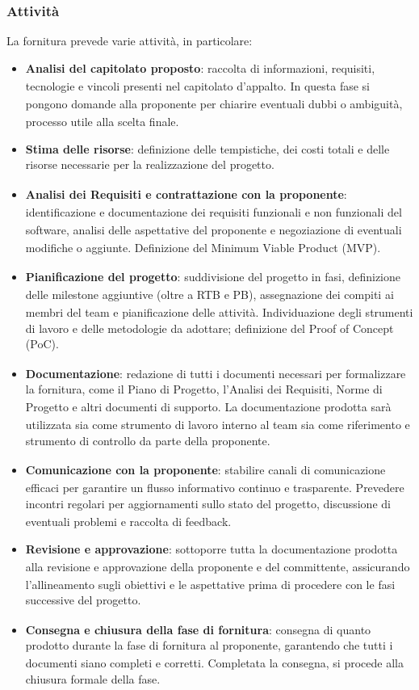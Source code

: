 \documentclass[a4paper,11pt]{article}
\newcommand{\G}{\textsubscript{\scalebox{0.6}{\textbf{G}}}}
\begin{document}
\subsubsection{Attività}
La fornitura prevede varie attività, in particolare: 
\begin{itemize}
    \item \textbf{Analisi del capitolato\G{} proposto}: raccolta di informazioni, requisiti\G{}, tecnologie e vincoli presenti nel 
    capitolato\G{} d'appalto. In questa fase si pongono domande alla proponente\G{} per chiarire eventuali dubbi o ambiguità, processo utile alla scelta finale.
    \item \textbf{Stima delle risorse}: definizione delle tempistiche, dei costi totali e delle risorse necessarie per la 
    realizzazione del progetto\G{}.
    \item \textbf{Analisi dei Requisiti\G{} e contrattazione con la proponente\G{}}: identificazione e documentazione dei requisiti\G{} 
    funzionali e non funzionali del software, analisi delle aspettative del proponente\G{} e negoziazione di eventuali modifiche o aggiunte. Definizione del Minimum Viable Product (MVP)\G{}.
    \item \textbf{Pianificazione del progetto\G{}}: suddivisione del progetto\G{} in fasi, definizione delle milestone\G{} aggiuntive (oltre a RTB\G{} e PB\G{}), 
    assegnazione dei compiti ai membri del team e pianificazione delle attività. Individuazione degli strumenti di lavoro e delle 
    metodologie da adottare; definizione del Proof of Concept (PoC)\G{}.
    \item \textbf{Documentazione}: redazione di tutti i documenti necessari per formalizzare la fornitura, come il Piano di Progetto\G{}, 
    l'Analisi dei Requisiti\G{}, Norme di Progetto\G{} e altri documenti di supporto. La documentazione prodotta sarà utilizzata sia come 
    strumento di lavoro interno al team sia come riferimento e strumento di controllo da parte della proponente\G{}.
    \item \textbf{Comunicazione con la proponente\G{}}: stabilire canali di comunicazione efficaci per garantire un flusso informativo 
    continuo e trasparente. Prevedere incontri regolari per aggiornamenti sullo stato del progetto\G{}, discussione di eventuali problemi 
    e raccolta di feedback.
    \item \textbf{Revisione e approvazione\G{}}: sottoporre tutta la documentazione prodotta alla revisione e approvazione\G{} della proponente\G{} e del committente\G{}, 
    assicurando l'allineamento sugli obiettivi e le aspettative prima di procedere con le fasi successive del progetto\G{}.
    \item \textbf{Consegna e chiusura della fase di fornitura}: consegna di quanto prodotto\G{} durante la fase di fornitura al proponente\G{}, 
    garantendo che tutti i documenti siano completi e corretti. Completata la consegna, si procede alla chiusura formale della fase.
\end{itemize}
\end{document}
